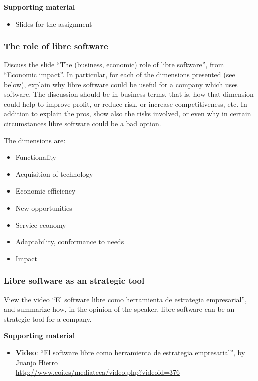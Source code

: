 \documentclass[a4paper]{article}
\begin{document}
\textbf{Supporting material}

\begin{itemize}
\item Slides for the assignment
\end{itemize}


\subsubsection{The role of libre software}
\label{sub:impact-role}

Discuss the slide ``The (business, economic) role of libre software'', from ``Economic impact''. In particular, for each of the dimensions presented (see below), explain why libre software could be useful for a company which uses software. The discussion should be in business terms, that is, how that dimension could help to improve profit, or reduce risk, or increase competitiveness, etc. In addition to explain the pros, show also the risks involved, or even why in certain circumstances libre software could be a bad option.

The dimensions are:

\begin{itemize}
\item Functionality
\item Acquisition of technology
\item Economic efficiency
\item New opportunities
\item Service economy
\item Adaptability, conformance to needs
\item Impact
\end{itemize}


\subsubsection{Libre software as an strategic tool}
\label{sub:impact-strategic-tool}

View the video ``El software libre como herramienta de estrategia empresarial'', and summarize how, in the opinion of the speaker, libre software can be an strategic tool for a company.

\textbf{Supporting material}

\begin{itemize}
\item \textbf{Video}: ``El software libre como herramienta de estrategia empresarial'', by Juanjo Hierro \\
  \url{http://www.eoi.es/mediateca/video.php?videoid=376}
\end{itemize}
\end{document}
